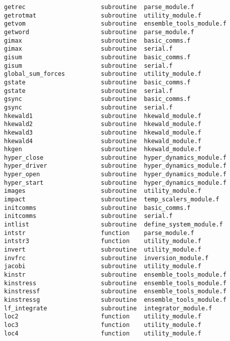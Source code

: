 \begin{verbatim}
getrec                     subroutine  parse_module.f            
getrotmat                  subroutine  utility_module.f          
getvom                     subroutine  ensemble_tools_module.f   
getword                    subroutine  parse_module.f            
gimax                      subroutine  basic_comms.f             
gimax                      subroutine  serial.f                  
gisum                      subroutine  basic_comms.f             
gisum                      subroutine  serial.f                  
global_sum_forces          subroutine  utility_module.f          
gstate                     subroutine  basic_comms.f             
gstate                     subroutine  serial.f                  
gsync                      subroutine  basic_comms.f             
gsync                      subroutine  serial.f                  
hkewald1                   subroutine  hkewald_module.f          
hkewald2                   subroutine  hkewald_module.f          
hkewald3                   subroutine  hkewald_module.f          
hkewald4                   subroutine  hkewald_module.f          
hkgen                      subroutine  hkewald_module.f          
hyper_close                subroutine  hyper_dynamics_module.f   
hyper_driver               subroutine  hyper_dynamics_module.f   
hyper_open                 subroutine  hyper_dynamics_module.f   
hyper_start                subroutine  hyper_dynamics_module.f   
images                     subroutine  utility_module.f          
impact                     subroutine  temp_scalers_module.f     
initcomms                  subroutine  basic_comms.f             
initcomms                  subroutine  serial.f                  
intlist                    subroutine  define_system_module.f    
intstr                     function    parse_module.f            
intstr3                    function    utility_module.f          
invert                     subroutine  utility_module.f          
invfrc                     subroutine  inversion_module.f        
jacobi                     subroutine  utility_module.f          
kinstr                     subroutine  ensemble_tools_module.f   
kinstress                  subroutine  ensemble_tools_module.f   
kinstressf                 subroutine  ensemble_tools_module.f   
kinstressg                 subroutine  ensemble_tools_module.f   
lf_integrate               subroutine  integrator_module.f       
loc2                       function    utility_module.f          
loc3                       function    utility_module.f          
loc4                       function    utility_module.f          

\end{verbatim}
